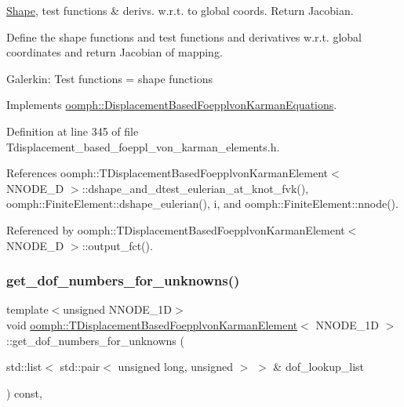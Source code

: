 \hyperlink{classoomph_1_1Shape}{Shape}, test functions \& derivs. w.\+r.\+t. to global coords. Return Jacobian. 

Define the shape functions and test functions and derivatives w.\+r.\+t. global coordinates and return Jacobian of mapping.

Galerkin\+: Test functions = shape functions 

Implements \hyperlink{classoomph_1_1DisplacementBasedFoepplvonKarmanEquations_a91d0e65a45461295c271b6f2e9604f67}{oomph\+::\+Displacement\+Based\+Foepplvon\+Karman\+Equations}.



Definition at line 345 of file Tdisplacement\+\_\+based\+\_\+foeppl\+\_\+von\+\_\+karman\+\_\+elements.\+h.



References oomph\+::\+T\+Displacement\+Based\+Foepplvon\+Karman\+Element$<$ N\+N\+O\+D\+E\+\_\+D $>$\+::dshape\+\_\+and\+\_\+dtest\+\_\+eulerian\+\_\+at\+\_\+knot\+\_\+fvk(), oomph\+::\+Finite\+Element\+::dshape\+\_\+eulerian(), i, and oomph\+::\+Finite\+Element\+::nnode().



Referenced by oomph\+::\+T\+Displacement\+Based\+Foepplvon\+Karman\+Element$<$ N\+N\+O\+D\+E\+\_\+D $>$\+::output\+\_\+fct().

\mbox{\label{classoomph_1_1TDisplacementBasedFoepplvonKarmanElement_ad029c2562317f83814272ad57d8f7582}} 
\subsubsection{\texorpdfstring{get\+\_\+dof\+\_\+numbers\+\_\+for\+\_\+unknowns()}{get\_dof\_numbers\_for\_unknowns()}}
{\footnotesize\ttfamily template$<$unsigned N\+N\+O\+D\+E\+\_\+1D$>$ \\
void \hyperlink{classoomph_1_1TDisplacementBasedFoepplvonKarmanElement}{oomph\+::\+T\+Displacement\+Based\+Foepplvon\+Karman\+Element}$<$ N\+N\+O\+D\+E\+\_\+1D $>$\+::get\+\_\+dof\+\_\+numbers\+\_\+for\+\_\+unknowns (\begin{DoxyParamCaption}\item[{std\+::list$<$ std\+::pair$<$ unsigned long, unsigned $>$ $>$ \&}]{dof\+\_\+lookup\+\_\+list }\end{DoxyParamCaption}) const\hspace{0.3cm}{\ttfamily [inline]}, {\ttfamily [virtual]}}



